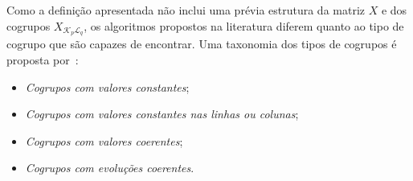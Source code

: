 \documentclass[
    12pt,                %
    oneside,            %
    a4paper,            %
    english,            %
    brazil                %
    ]{abntex2ppgsi}
\begin{document}
Como a definição apresentada não inclui uma prévia estrutura da matriz $X$ e dos cogrupos $X_{\mathcal{K}_p \mathcal{L}_q}$, os algoritmos propostos na literatura diferem quanto ao tipo de cogrupo que são capazes de encontrar.
Uma taxonomia dos tipos de cogrupos é proposta por~:
 \begin{itemize}
    \item \textit{Cogrupos com valores constantes};
    \item \textit{Cogrupos com valores constantes nas linhas ou colunas};
    \item \textit{Cogrupos com valores coerentes};
    \item \textit{Cogrupos com evoluções coerentes}.
 \end{itemize}
\end{document}

